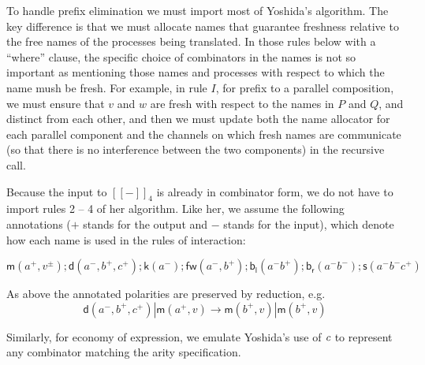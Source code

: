 \documentclass{llncs}
\newcommand{\ldb}{[\![}
\newcommand{\rdb}{]\!]}
\newcommand{\binpar}[2]{#1 | #2}
\newcommand{\meaningof}[1]{\ldb #1 \rdb}
\begin{document}
To handle prefix elimination we must import most of Yoshida's
algorithm. The key difference is that we must allocate names that
guarantee freshness relative to the free names of the processes being
translated. In those rules below with a ``where'' clause, the specific
choice of combinators in the names is not so important as mentioning
those names and processes with respect to which the name mush be fresh.
For example, in rule $I$, for prefix to a parallel
composition, we must ensure that $v$ and $w$ are fresh with respect to
the names in $P$ and $Q$, and distinct from each other, and then we
must update both the name allocator for each parallel component and
the channels on which fresh names are communicate (so that there is no
interference between the two components) in the recursive call. 

Because the input to $\meaningof{-}_4$ is already in combinator form,
we do not have to import rules 2 -- 4 of her algorithm. Like her, we
assume the following annotations ($+$ stands for the output and $-$
stands for the input), which denote how each name is used in the rules
of interaction:

\[\mathsf{m}(a^{+},v^{\pm});\mathsf{d}(a^{-},b^{+},c^{+});\mathsf{k}(a^{-});\mathsf{fw}(a^{-},b^{+});\mathsf{b}_{\mathsf{l}}(a^{-}b^{+});\mathsf{b}_{\mathsf{r}}(a^{-}b^{-});\mathsf{s}(a^{-}b^{-}c^{+})\]

As above the annotated polarities are preserved by reduction, e.g.
\[\binpar{\mathsf{d}(a^{-},b^{+},c^{+})}{\mathsf{m}(a^{+},v)} \to \binpar{\mathsf{m}(b^{+},v)}{\mathsf{m}(b^{+},v)}\]

Similarly, for economy of expression, we emulate Yoshida's use of
$\emph{c}$ to represent any combinator matching the arity
specification. 
\end{document}
